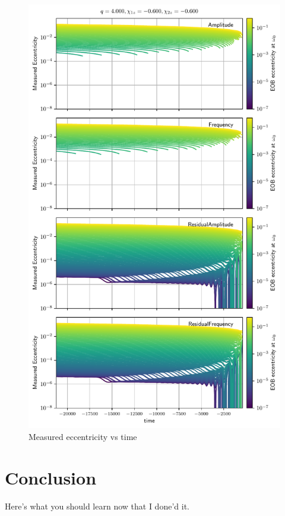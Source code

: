 \documentclass[aps,prd,amsmath,floats,floatfix, twocolumn,
superscriptaddress,nofootinbib,showpacs]{revtex4-1}
\begin{document}
\begin{figure}[thb]
\includegraphics[width=\columnwidth]{test_measured_ecc_vs_time_example}
\caption{Measured eccentricity vs time}
\label{fig:measured_ecc_vs_time}
\end{figure}

\section{Conclusion}
\label{sec:conclusion}
Here's what you should learn now that I done'd it.
\end{document}
